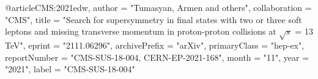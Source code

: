 @article{CMS:2021edw,
    author = "Tumasyan, Armen and others",
    collaboration = "CMS",
    title = "{Search for supersymmetry in final states with two or three soft leptons and missing transverse momentum in proton-proton collisions at $\sqrt{s}$ = 13 TeV}",
    eprint = "2111.06296",
    archivePrefix = "arXiv",
    primaryClass = "hep-ex",
    reportNumber = "CMS-SUS-18-004, CERN-EP-2021-168",
    month = "11",
    year = "2021",
    label = "CMS-SUS-18-004"
}

